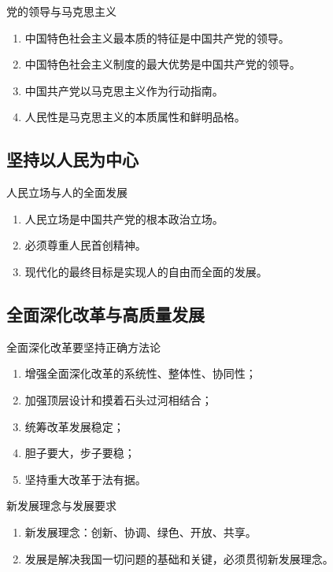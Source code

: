 \documentclass[12pt,a4paper]{ctexart}
\begin{document}
\begin{yellowbox}{党的领导与马克思主义}
\begin{enumerate}
  \item 中国特色社会主义最本质的特征是中国共产党的领导。
  \item 中国特色社会主义制度的最大优势是中国共产党的领导。
  \item 中国共产党以马克思主义作为行动指南。
  \item 人民性是马克思主义的本质属性和鲜明品格。
\end{enumerate}
\end{yellowbox}

\subsection{坚持以人民为中心}

\begin{yellowbox}{人民立场与人的全面发展}
\begin{enumerate}
  \item 人民立场是中国共产党的根本政治立场。
  \item 必须尊重人民首创精神。
  \item 现代化的最终目标是实现人的自由而全面的发展。
\end{enumerate}
\end{yellowbox}

\subsection{全面深化改革与高质量发展}

\begin{yellowbox}{全面深化改革要坚持正确方法论}
\begin{enumerate}
  \item 增强全面深化改革的系统性、整体性、协同性；
  \item 加强顶层设计和摸着石头过河相结合；
  \item 统筹改革发展稳定；
  \item 胆子要大，步子要稳；
  \item 坚持重大改革于法有据。
\end{enumerate}
\end{yellowbox}

\begin{yellowbox}{新发展理念与发展要求}
\begin{enumerate}
  \item 新发展理念：创新、协调、绿色、开放、共享。
  \item 发展是解决我国一切问题的基础和关键，必须贯彻新发展理念。
\end{enumerate}
\end{yellowbox}
\end{document}
